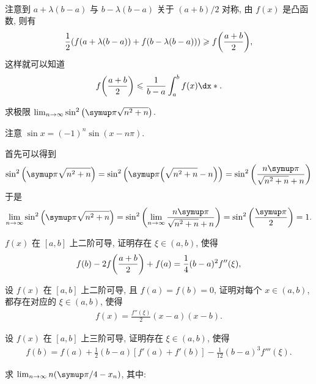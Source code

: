 \begin{exercise}[series=exer]
\begin{answer}
\begin{align*}
      \end{align*}
      注意到 $ a + \lambda(b - a) $ 与 $ b - \lambda(b - a) $ 关于 $ (a + b)/2 $ 对称, 由 $ f(x) $ 是凸函数, 则有
      \begin{align*}
          \frac{1}{2}(f(a + \lambda(b - a)) + f(b - \lambda(b - a))) \geqslant f\qty(\frac{a + b}{2}),
      \end{align*}
      这样就可以知道
      \begin{align*}
          f\qty(\frac{a + b}{2}) \le \frac{1}{b - a} \int_{a}^{b} f(x) \dx*.
      \end{align*}
  \end{answer}
  \item 求极限 $ \limit{n}{\infty} \sin^{2}\qty(\pi \sqrt{n^{2} + n}) $.
  \begin{hint}
      注意 $ \sin x = (-1)^n \sin (x - n \pi) $.
  \end{hint}
  \begin{answer}
      首先可以得到
      \begin{align*}
          \sin^{2}\qty(\pi \sqrt{n^{2} + n}) = \sin^{2}\qty(\pi \qty(\sqrt{n^{2} + n} - n)) = \sin^{2}\qty(\frac{n\pi}{\sqrt{n^{2} + n} + n})
      \end{align*}
      于是
      \begin{align*}
          \limit{n}{\infty}\sin^{2}\qty(\pi \sqrt{n^{2} + n}) = \sin^{2}\qty(\limit{n}{\infty}\frac{n\pi}{\sqrt{n^{2} + n} + n}) = \sin^{2}\qty(\frac{\pi}{2}) = 1.
      \end{align*}
  \end{answer}
  \item $ f(x) $ 在 $ [a, b] $ 上二阶可导, 证明存在 $ \xi \in (a, b) $, 使得
  \begin{align*}
      f(b) - 2f\qty(\frac{a + b}{2}) + f(a) = \frac{1}{4} (b - a)^{2} f''(\xi),
  \end{align*}
  \item 设 $ f(x) $ 在 $ [a, b] $ 上二阶可导, 且 $ f(a) = f(b)  = 0 $, 证明对每个 $ x \in (a, b) $, 都存在对应的 $ \xi \in (a, b) $, 使得
  \begin{align*}
      f(x) = \frac{f''(\xi)}{2} (x - a) (x - b).
  \end{align*}
  \item 设 $ f(x) $ 在 $ [a, b] $ 上三阶可导, 证明存在 $ \xi \in (a, b) $, 使得
  \begin{align*}
      f(b) = f(a) + \frac{1}{2} (b - a) [f'(a) + f'(b)] - \frac{1}{12} (b - a)^{3} f'''(\xi).
  \end{align*}
  \item 求 $ \limit{n}{\infty} n \qty(\pi/4 - x_{n}) $, 其中:

\end{exercise}
